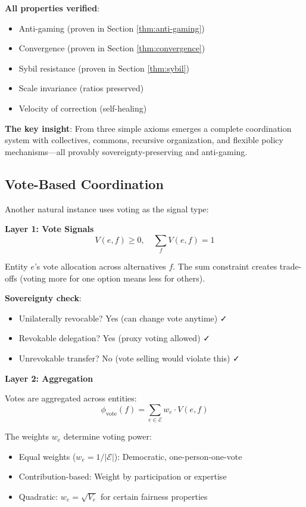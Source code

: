 \documentclass[11pt,a4paper]{article}
\theoremstyle{definition}
\theoremstyle{remark}
\newcommand{\E}{\mathcal{E}}
\begin{document}
\textbf{All properties verified}:
\begin{itemize}
\item Anti-gaming (proven in Section \ref{thm:anti-gaming})
\item Convergence (proven in Section \ref{thm:convergence})
\item Sybil resistance (proven in Section \ref{thm:sybil})
\item Scale invariance (ratios preserved)
\item Velocity of correction (self-healing)
\end{itemize}

\textbf{The key insight}: From three simple axioms emerges a complete coordination system with collectives, commons, recursive organization, and flexible policy mechanisms—all provably sovereignty-preserving and anti-gaming.

\subsection{Vote-Based Coordination}

Another natural instance uses voting as the signal type:

\textbf{Layer 1: Vote Signals}
\[ V(e,f) \ge 0, \quad \sum_f V(e,f) = 1 \]

Entity $e$'s vote allocation across alternatives $f$. The sum constraint creates trade-offs (voting more for one option means less for others).

\textbf{Sovereignty check}:
\begin{itemize}
\item Unilaterally revocable? Yes (can change vote anytime) ✓
\item Revokable delegation? Yes (proxy voting allowed) ✓
\item Unrevokable transfer? No (vote selling would violate this) ✓
\end{itemize}

\textbf{Layer 2: Aggregation}

Votes are aggregated across entities:
\[ \phi_{\text{vote}}(f) = \sum_{e \in \E} w_e \cdot V(e,f) \]

The weights $w_e$ determine voting power:
\begin{itemize}
\item Equal weights ($w_e = 1/|\E|$): Democratic, one-person-one-vote
\item Contribution-based: Weight by participation or expertise
\item Quadratic: $w_e = \sqrt{V_e}$ for certain fairness properties
\end{itemize}
\end{document}
